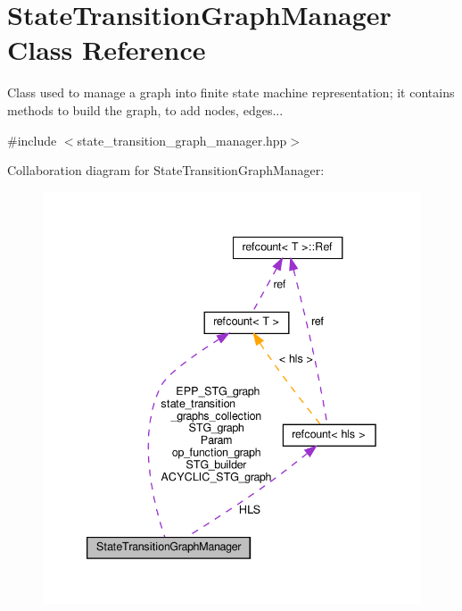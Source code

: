\hypertarget{classStateTransitionGraphManager}{}\section{State\+Transition\+Graph\+Manager Class Reference}
\label{classStateTransitionGraphManager}


Class used to manage a graph into finite state machine representation; it contains methods to build the graph, to add nodes, edges...  




{\ttfamily \#include $<$state\+\_\+transition\+\_\+graph\+\_\+manager.\+hpp$>$}



Collaboration diagram for State\+Transition\+Graph\+Manager\+:
\nopagebreak
\begin{figure}[H]
\begin{center}
\leavevmode
\includegraphics[width=339pt]{dd/df7/classStateTransitionGraphManager__coll__graph}
\end{center}
\end{figure}
